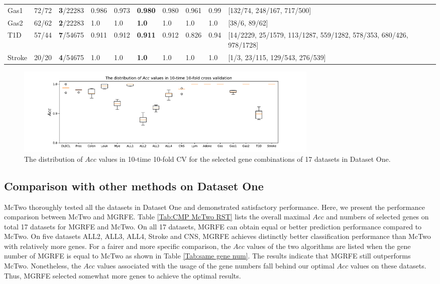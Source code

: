 \documentclass[10pt,journal,compsoc]{IEEEtran}
\begin{document}
\begin{table}[!htbp]
{\begin{tabular}{l|lllllllll}
				Gas1 & 72/72 & \textbf{3}/22283 & 0.986 & 0.973 & \textbf{0.980} & 0.980 & 0.961 & 0.99 & [132/74, 248/167, 717/500]\\
				Gas2 & 62/62 & \textbf{2}/22283 & 1.0 & 1.0 & \textbf{1.0} & 1.0 & 1.0 & 1.0 & [38/6, 89/62]\\
				T1D & 57/44 & \textbf{7}/54675 & 0.911 & 0.912 & \textbf{0.911} & 0.912 & 0.826 & 0.94 & [14/2229, 25/1579, 113/1287, 559/1282, 578/353, 680/426, 978/1728]\\
				Stroke & 20/20 & \textbf{4}/54675 & 1.0 & 1.0 & \textbf{1.0} & 1.0 & 1.0 & 1.0 & [1/3, 23/115, 129/543, 276/539]\\
				\bottomrule
		\end{tabular}}
	\end{table}
	\begin{figure}[htbp]
		\centering
		\includegraphics[width=0.72\textwidth]{pictures/CV1.pdf}
		\caption{The distribution of $Acc$ values in 10-time 10-fold CV for the selected gene combinations of 17 datasets in Dataset One.}
		\label{Fig:CV1}
	\end{figure}
	
	\subsection{Comparison with other methods on Dataset One}
	
	McTwo \cite{W16} thoroughly tested all the datasets in Dataset One and demonstrated satisfactory performance. Here, we present the performance comparison between McTwo and MGRFE. Table \ref{Tab:CMP McTwo RST} lists the overall maximal \(Acc\) and numbers of selected genes on total 17 datasets for MGRFE and McTwo. 
	On all 17 datasets, MGRFE can obtain equal or better prediction performance compared to McTwo. 
	On five datasets ALL2, ALL3, ALL4, Stroke and CNS, MGRFE achieves distinctly better classification performance than McTwo with relatively more genes. For a fairer and more specific comparison, the \(Acc\) values of the two algorithms are listed when the gene number of MGRFE is equal to McTwo as shown in Table \ref{Tab:same gene num}. The results indicate that MGRFE still outperforms McTwo. Nonetheless, the \(Acc\) values associated with the usage of the gene numbers fall behind our optimal \(Acc\) values on these datasets. Thus, MGRFE selected somewhat more genes to achieve the optimal results.
	
\end{document}
